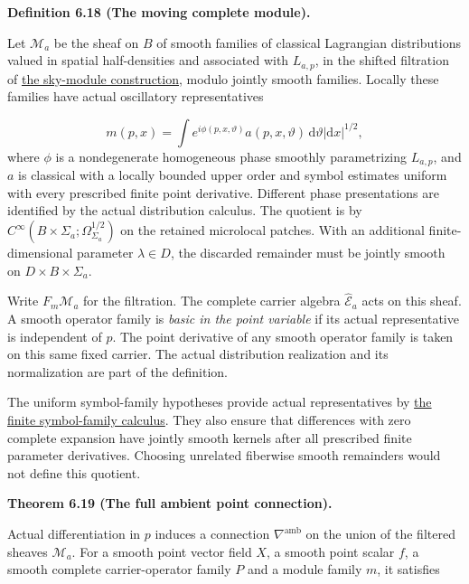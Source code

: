 \documentclass[
  english,
  11pt,
  reqno]{amsart}
\makeatletter
\newcommand{\pandocstatementheading}[1]{%
  \par\addpenalty{\@beginparpenalty}%
  \addvspace{.5\baselineskip plus .2\baselineskip minus .2\baselineskip}%
  {\normalfont\bfseries #1\par}%
  \nobreak\@afterindenttrue\@afterheading
}
\makeatother
\begin{document}
\pandocstatementheading{\leavevmode{}\label{def:online-moving-wave-module}Definition 6.18 (The moving complete module).}

Let \(\mathscr M_a\) be the sheaf on \(B\) of smooth families of
classical Lagrangian distributions valued in spatial half-densities and
associated with \(L_{a,p}\), in the shifted filtration of
\hyperref[prop:online-shifted-sky-modules]{the sky-module construction},
modulo jointly smooth families. Locally these families have actual
oscillatory representatives

\label{eq:online-moving-module-oscillatory-family} \[
m(p,x)=\int e^{i\phi(p,x,\vartheta)}
          a(p,x,\vartheta)\,\mathrm d\vartheta
          |\mathrm dx|^{1/2},
\] where \(\phi\) is a nondegenerate homogeneous phase smoothly
parametrizing \(L_{a,p}\), and \(a\) is classical with a locally bounded
upper order and symbol estimates uniform with every prescribed finite
point derivative. Different phase presentations are identified by the
actual distribution calculus. The quotient is by
\(C^\infty(B\times\Sigma_a;\Omega_{\Sigma_a}^{1/2})\) on the retained
microlocal patches. With an additional finite-dimensional parameter
\(\lambda\in D\), the discarded remainder must be jointly smooth on
\(D\times B\times\Sigma_a\).

Write \(F_m\mathscr M_a\) for the filtration. The complete carrier
algebra \(\widehat{\mathscr E}_a\) acts on this sheaf. A smooth operator
family is \emph{basic in the point variable} if its actual
representative is independent of \(p\). The point derivative of any
smooth operator family is taken on this same fixed carrier. The actual
distribution realization and its normalization are part of the
definition.

The uniform symbol-family hypotheses provide actual representatives by
\hyperref[lem:online-finite-symbol-family-calculus]{the finite
symbol-family calculus}. They also ensure that differences with zero
complete expansion have jointly smooth kernels after all prescribed
finite parameter derivatives. Choosing unrelated fiberwise smooth
remainders would not define this quotient.

\pandocstatementheading{\leavevmode{}\label{thm:online-ambient-point-connection}Theorem 6.19 (The full ambient point connection).}

Actual differentiation in \(p\) induces a connection
\(\nabla^{\mathrm{amb}}\) on the union of the filtered sheaves
\(\mathscr M_a\). For a smooth point vector field \(X\), a smooth point
scalar \(f\), a smooth complete carrier-operator family \(P\) and a
module family \(m\), it satisfies
\end{document}
